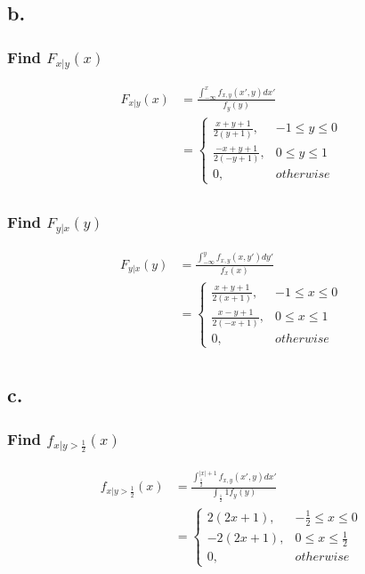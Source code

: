 \documentclass[12pt]{article}
\begin{document}
\subsection*{b.}
\subsubsection*{Find $F_{x|y}(x)$}
\begin{align*}
  F_{x|y}(x) &= \frac{\int_{-\infty}^x f_{x,y}(x',y)dx'}{f_y(y)} \\
  &= \begin{cases}
    \frac{x+y+1}{2(y+1)}, & -1 \leq y \leq 0  \\
    \frac{-x+y+1}{2(-y+1)}, & 0 \leq y \leq 1  \\
    0, & otherwise
  \end{cases} \\
\end{align*} 

\subsubsection*{Find $F_{y|x}(y)$}
\begin{align*}
  F_{y|x}(y) &= \frac{\int_{-\infty}^y f_{x,y}(x,y')dy'}{f_x(x)} \\
  &= \begin{cases}
    \frac{x+y+1}{2(x+1)}, & -1 \leq x \leq 0 \\
    \frac{x-y+1}{2(-x+1)}, & 0 \leq x \leq 1 \\
    0, & otherwise
  \end{cases} \\
\end{align*} 

\subsection*{c.}
\subsubsection*{Find $f_{x|y>\frac{1}{2}}(x)$}
\begin{align*}
  f_{x|y>\frac{1}{2}}(x) &= \frac{\int_{\frac{1}{2}}^{|x|+1} f_{x,y}(x',y)dx'}{\int_{\frac{1}{2}}{1}f_y(y)} \\
  &= \begin{cases}
    2(2x+1), & -\frac{1}{2} \leq x \leq 0 \\
    -2(2x+1), & 0 \leq x \leq \frac{1}{2} \\
    0, & otherwise
  \end{cases} \\
\end{align*} 
\end{document}
